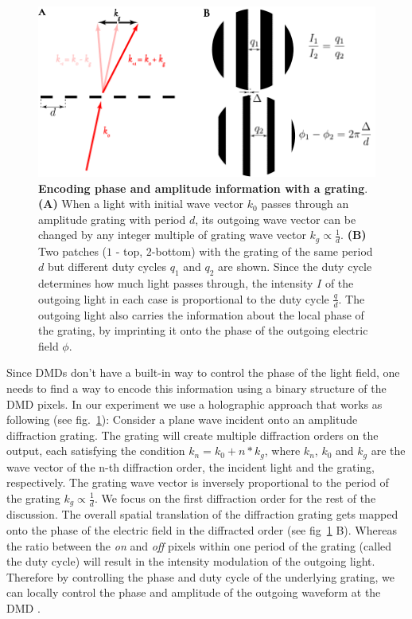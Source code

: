 \begin{figure}[t]
	\centering
	\includegraphics[scale=1]{figures/DMD_grating.pdf}
	\caption{{\bf Encoding phase and amplitude information with a grating}. {\bf (A)} When a light with initial wave vector $k_0$ passes through an amplitude grating with period $d$, its outgoing wave vector can be changed by any integer multiple of grating wave vector $k_g\propto \frac{1}{d}$. {\bf (B)} Two patches ($1$ - top, $2$-bottom) with the grating of the same period $d$ but different duty cycles $q_1$ and $q_2$ are shown. Since the duty cycle determines how much light passes through, the intensity $I$ of the outgoing light in each case is proportional to the duty cycle $\frac{q}{d}$. The outgoing light also carries the information about the local phase of the grating, by imprinting it onto the phase of the outgoing electric field $\phi$.}
	\label{fig:DMD_grating}
\end{figure}



Since DMDs don't have a built-in way to control the phase of the light field, one needs to find a way to encode this information using a binary structure of the DMD pixels. In our experiment we use a holographic approach that works as following (see fig.~\ref{fig:DMD_grating}): Consider a plane wave incident onto an amplitude diffraction grating. The grating will create multiple diffraction orders on the output, each satisfying the condition $k_n = k_0 + n*k_g$, where $k_n$, $k_0$ and $k_g$ are the wave vector of the n-th diffraction order, the incident light and the grating, respectively. The grating wave vector is inversely proportional to the period of the grating $k_g \propto \frac{1}{d}$. We focus on the first diffraction order for the rest of the discussion. The overall spatial translation of the diffraction grating gets mapped onto the phase of the electric field in the diffracted order (see fig~\ref{fig:DMD_grating} B). Whereas the ratio between the \textit{on} and \textit{off} pixels within one period of the grating (called the duty cycle) will result in the intensity modulation of the outgoing light. Therefore by controlling the phase and duty cycle of the underlying grating, we can locally control the phase and amplitude of the outgoing waveform at the DMD \cite{Zupanchich thesis}.

